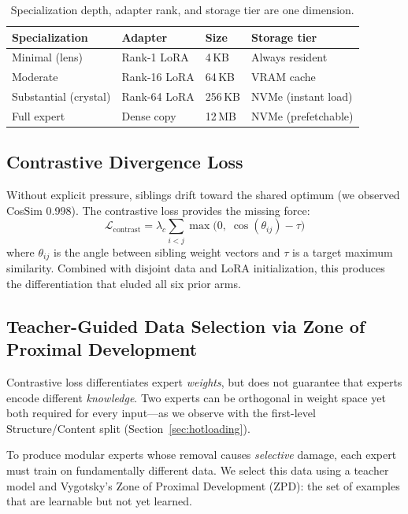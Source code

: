 \documentclass{article}
\begin{document}
\begin{table}[t]
\centering
\caption{Specialization depth, adapter rank, and storage tier are one dimension.}
\label{tab:unification}
\begin{tabular}{@{}llll@{}}
\toprule
Specialization & Adapter & Size & Storage tier \\
\midrule
Minimal (lens) & Rank-1 LoRA & 4\,KB & Always resident \\
Moderate       & Rank-16 LoRA & 64\,KB & VRAM cache \\
Substantial (crystal) & Rank-64 LoRA & 256\,KB & NVMe (instant load) \\
Full expert    & Dense copy & 12\,MB & NVMe (prefetchable) \\
\bottomrule
\end{tabular}
\end{table}

\subsection{Contrastive Divergence Loss}
\label{sec:contrastive}

Without explicit pressure, siblings drift toward the shared optimum (we observed
CosSim 0.998). The contrastive loss provides the missing force:
\begin{equation}
\mathcal{L}_{\text{contrast}} = \lambda_c \sum_{i < j} \max\bigl(0,\; \cos(\theta_{ij}) - \tau\bigr)
\label{eq:contrastive}
\end{equation}
where $\theta_{ij}$ is the angle between sibling weight vectors and $\tau$ is a
target maximum similarity. Combined with disjoint data and LoRA initialization,
this produces the differentiation that eluded all six prior arms.

\subsection{Teacher-Guided Data Selection via Zone of Proximal Development}
\label{sec:zpd}

Contrastive loss differentiates expert \emph{weights}, but does not guarantee
that experts encode different \emph{knowledge}. Two experts can be orthogonal
in weight space yet both required for every input---as we observe with the
first-level Structure/Content split (Section~\ref{sec:hotloading}).

To produce modular experts whose removal causes \emph{selective} damage, each
expert must train on fundamentally different data. We select this data using a
teacher model and Vygotsky's Zone of Proximal Development (ZPD): the set of
examples that are learnable but not yet learned.
\end{document}
